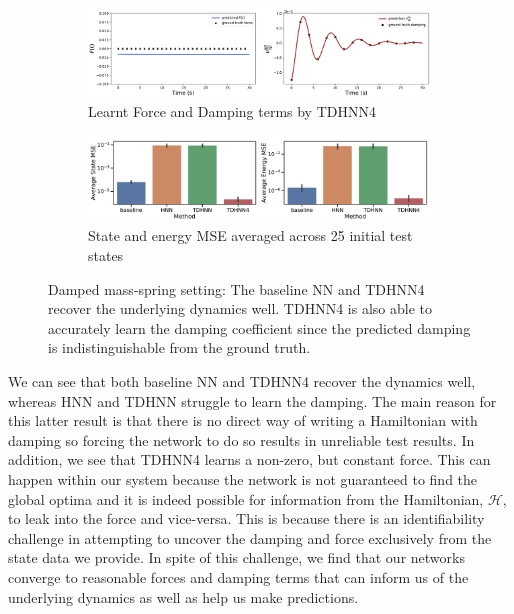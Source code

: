 \documentclass{article}
\begin{document}
\begin{figure}[h!]
\centering
\captionsetup{justification=centering}
	\begin{subfigure}[b]{0.48\textwidth}
		\centering
		\includegraphics[width=\textwidth]{figures/figures/damped/1/damped_dpdt_new_0.pdf}
		\caption{Learnt Force and Damping terms by TDHNN4}
	\end{subfigure}
	\begin{subfigure}[b]{0.48\textwidth}
	    \centering
		\includegraphics[width=\textwidth]{figures/figures/damped/1/damped_errors_0.pdf}
		\caption{State and energy MSE averaged across 25 initial test states}
	\end{subfigure}
\caption{Damped mass-spring setting: The baseline NN and TDHNN4 recover the underlying dynamics well. TDHNN4 is also able to accurately learn the damping coefficient since the predicted damping is indistinguishable from the ground truth.}
\label{damped}
\end{figure}

We can see that both baseline NN and TDHNN4 recover the dynamics well, whereas HNN and TDHNN struggle to learn the damping. The main reason for this latter result is that there is no direct way of writing a Hamiltonian with damping so forcing the network to do so results in unreliable test results. In addition, we see that TDHNN4 learns a non-zero, but constant force. This can happen within our system because the network is not guaranteed to find the global optima and it is indeed possible for information from the Hamiltonian, $\mathcal{H}$, to leak into the force and vice-versa. This is because there is an identifiability challenge in attempting to uncover the damping and force exclusively from the state data we provide. In spite of this challenge, we find that our networks converge to reasonable forces and damping terms that can inform us of the underlying dynamics as well as help us make predictions.
\end{document}
